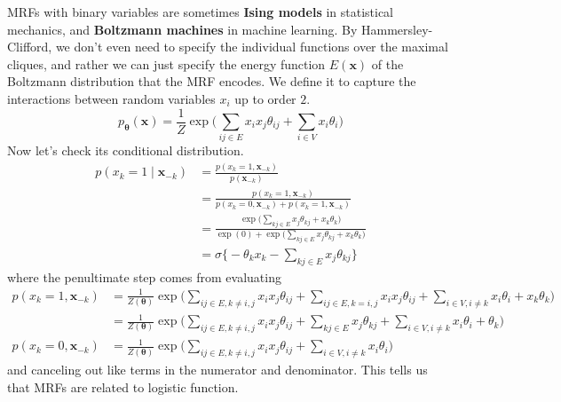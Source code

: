 \documentclass{article}
\begin{document}
    \begin{definition}
      MRFs with binary variables are sometimes \textbf{Ising models} in statistical mechanics, and \textbf{Boltzmann machines} in machine learning. By Hammersley-Clifford, we don't even need to specify the individual functions over the maximal cliques, and rather we can just specify the energy function $E(\mathbf{x})$ of the Boltzmann distribution that the MRF encodes. We define it to capture the interactions between random variables $x_i$ up to order $2$. 
        \[p_{\boldsymbol{\theta}} (\mathbf{x}) = \frac{1}{Z} \exp \bigg( \sum_{ij \in E} x_i x_j \theta_{ij} + \sum_{i \in V} x_i \theta_i \bigg) \]
      Now let's check its conditional distribution. 
        \begin{align*}
          p(x_k = 1 \mid \mathbf{x}_{-k}) & = \frac{p(x_k = 1, \mathbf{x}_{-k})}{p(\mathbf{x}_{-k})} \\
                                          & = \frac{p(x_k = 1, \mathbf{x}_{-k})}{p(x_k = 0, \mathbf{x}_{-k}) + p(x_k = 1, \mathbf{x}_{-k})} \\
                                          & = \frac{\exp \Big( \sum_{k j \in E} x_j \theta_{kj} + x_k \theta_k \Big)}{\exp(0) + \exp \Big(\sum_{k j \in E} x_j \theta_{kj} + x_k \theta_k \Big)} \\
                                          & = \sigma \bigg\{ - \theta_k x_k - \sum_{k j \in E} x_j \theta_{k j} \bigg\} 
        \end{align*}
      where the penultimate step comes from evaluating 
        \begin{align*} 
          p(x_k = 1, \mathbf{x}_{-k}) & = \frac{1}{Z(\boldsymbol{\theta})} \exp \bigg( \sum_{ij \in E, k \neq i, j} x_i x_j \theta_{ij} + \sum_{i j \in E, k = i, j} x_i x_j \theta_{ij} + \sum_{i \in V, i \neq k} x_i \theta_i + x_k \theta_k \bigg) \\
                                      & =\frac{1}{Z(\boldsymbol{\theta})} \exp \bigg( \sum_{ij \in E, k \neq i, j} x_i x_j \theta_{ij} + \sum_{k j \in E} x_j \theta_{kj} + \sum_{i \in V, i \neq k} x_i \theta_i + \theta_k \bigg)  \\ 
          p(x_k = 0, \mathbf{x}_{-k}) & = \frac{1}{Z(\boldsymbol{\theta})} \exp \bigg( \sum_{ij \in E, k \neq i, j} x_i x_j \theta_{ij} + \sum_{i \in V, i \neq k} x_i \theta_i\bigg)  
        \end{align*}
      and canceling out like terms in the numerator and denominator. This tells us that MRFs are related to logistic function.  
    \end{definition}
\end{document}
